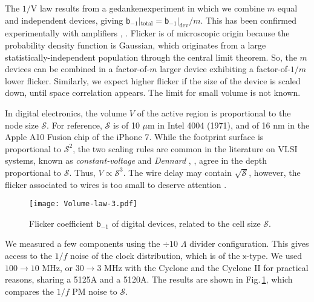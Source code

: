 \documentclass{article}
\begin{document}
The $1/\mathrm{V}$ law results from a gedankenexperiment in which we combine $m$ equal and independent devices, giving $\mathsf{b}_{-1}|_\text{total}=\mathsf{b}_{-1}|_\text{dev}/m$.  
This has been confirmed experimentally with amplifiers \cite[Chapter\,2]{Rubiola-2008-Leeson}, \cite{Boudot-2012}.  
Flicker is of microscopic origin because the probability density function is Gaussian, which originates from a large statistically-independent population through the central limit theorem.
So, the $m$ devices can be combined in a factor-of-$m$ larger device exhibiting a factor-of-$1/m$ lower flicker.  Similarly, we expect higher flicker if the size of the device is scaled down, until space correlation appears.  The limit for small volume is not known.

In digital electronics, the volume $V$ of the active region is proportional to the node size $\mathcal{S}$.  For reference, $\mathcal{S}$ is of 10 $\mu$m in Intel 4004 (1971), and of 16 nm in the Apple A10 Fusion chip of the iPhone 7.  
While the footprint surface is proportional to $\mathcal{S}^2$, 
the two scaling rules are common in the literature on VLSI systems, known as \emph{constant-voltage} and \emph{Dennard} \cite[P.\,253]{Weste-2011}, \cite{Dennard-1974}, agree in the depth proportional to $\mathcal{S}$.  Thus, $V\propto\mathcal{S}^3$\@.  
The wire delay may contain $\sqrt{\mathcal{S}}$, however, the flicker associated to wires is too small to deserve attention \cite{Verbruggen-1989}.


\begin{figure}
\centering
\texttt{[image: Volume-law-3.pdf]}
\caption{Flicker coefficient $\mathsf{b}_{-1}$ of digital devices, related to the cell size $\mathcal{S}$.}
\label{fig:Volume-law}
\end{figure}
We measured a few components using the $\div10$ $\Lambda$ divider configuration.  This gives access to the $1/f$ noise of the clock distribution, which is of the $\mathsf{x}$-type.
We used $100\rightarrow10$ MHz, or $30\rightarrow3$ MHz with the Cyclone and the Cyclone II for practical reasons, sharing a 5125A and a 5120A\@. 
The results are shown in Fig.\,\ref{fig:Volume-law}, which compares the $1/f$ PM noise to $\mathcal{S}$. 
\end{document}
